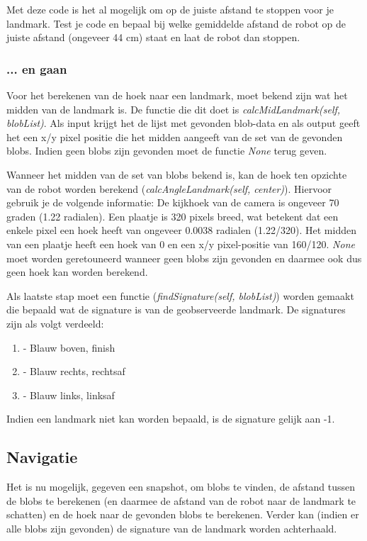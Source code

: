 \documentclass[a4paper]{article}
\begin{document}
Met deze code is het al mogelijk om op de juiste afstand te stoppen voor je landmark. Test je code en bepaal bij welke gemiddelde afstand de robot op de juiste afstand (ongeveer 44 cm) staat en laat de robot dan stoppen.

\subsubsection{... en gaan}
Voor het berekenen van de hoek naar een landmark, moet bekend zijn wat het midden van de landmark is. De functie die dit doet is \textit{calcMidLandmark(self, blobList)}. Als input krijgt het de lijst met gevonden blob-data en als output geeft het een x/y pixel positie die het midden aangeeft van de set van de gevonden blobs. Indien geen blobs zijn gevonden moet de functie \textit{None} terug geven.

Wanneer het midden van de set van blobs bekend is, kan de hoek ten opzichte van de robot worden berekend (\textit{calcAngleLandmark(self, center)}). Hiervoor gebruik je de volgende informatie:
De kijkhoek van de camera is ongeveer 70 graden (1.22 radialen). Een plaatje is 320 pixels breed, wat betekent dat een enkele pixel een hoek heeft van ongeveer 0.0038 radialen (1.22/320). Het midden van een plaatje heeft een hoek van 0 en een x/y pixel-positie van 160/120. \textit{None} moet worden geretouneerd wanneer geen blobs zijn gevonden en daarmee ook dus geen hoek kan worden berekend.

Als laatste stap moet een functie (\textit{findSignature(self, blobList)}) worden gemaakt die bepaald wat de signature is van de geobserveerde landmark. De signatures zijn als volgt verdeeld:

\begin{enumerate}
\item - Blauw boven, finish
\item - Blauw rechts, rechtsaf
\item - Blauw links, linksaf
\end{enumerate}

Indien een landmark niet kan worden bepaald, is de signature gelijk aan -1.

\subsection{Navigatie}

Het is nu mogelijk, gegeven een snapshot, om blobs te vinden, de afstand tussen de blobs te berekenen (en daarmee de afstand van de robot naar de landmark te schatten) en de hoek naar de gevonden blobs te berekenen. Verder kan (indien er alle blobs zijn gevonden) de signature van de landmark worden achterhaald.
\end{document}
